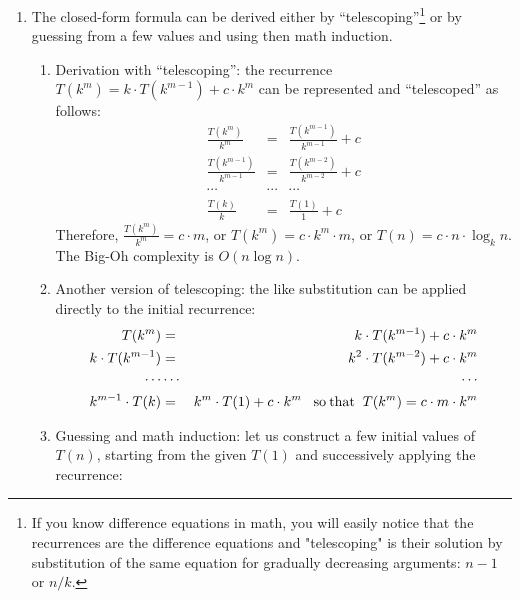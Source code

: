 \documentclass[]{article}
\begin{document}
\begin{enumerate}

\item  The closed-form formula can be derived either by ``telescoping''\footnote{If you know
difference equations in math, you will easily notice that the recurrences are the difference
equations and "telescoping" is their solution by substitution of the same equation for 
gradually decreasing arguments: $n-1$ or $n/k$.}
   or by guessing from a few values and using then math induction.
 \begin{enumerate}
 \item \textsf{Derivation with ``telescoping'':}
the recurrence $T(k^{m}) = k \cdot T(k^{m-1}) + c \cdot k^{m}$ 
can be represented and ``telescoped'' as follows:
\begin{eqnarray*}
\frac{T(k^{m})}{k^{m}} & = & \frac{T(k^{m-1})}{k^{m-1}} + c\\
\frac{T(k^{m-1})}{k^{m-1}} & = & \frac{T(k^{m-2})}{k^{m-2}} + c\\
\cdots & \cdots & \cdots\\
\frac{T(k)}{k} & = & \frac{T(1)}{1} + c
\end{eqnarray*}
Therefore, $\frac{T(k^{m})}{k^{m}} = c \cdot m$, or 
$T(k^{m}) = c \cdot k^{m} \cdot m$, or $T(n) = c \cdot n \cdot \log_{k}n$.
The Big-Oh complexity is $O(n\log n)$. 

\item \textsf{Another version of telescoping:} the like substitution
can be applied directly to the initial recurrence:
\begin{eqnarray*}
T(k^{m}) & = & k \cdot T(k^{m-1}) + c \cdot k^{m}\\
k\cdot T(k^{m-1}) & = & k^{2} \cdot T(k^{m-2}) + c \cdot k^{m}\\
\cdots & \cdots & \cdots\\
k^{m-1}\cdot  T(k) &=& k^{m}\cdot T(1) + c \cdot k^{m}
\;\;\; {\rm so} \: {\rm that} \;\; T(k^{m})= c \cdot m \cdot k^{m} 
\end{eqnarray*}

\item \textsf{Guessing and math induction:} let us construct a
few initial values of \(T(n)\), starting from the given \(T(1)\) and
successively applying the recurrence:


\end{enumerate}
\end{enumerate}
\end{document}
